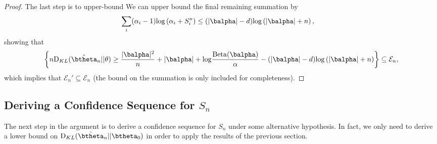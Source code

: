 \documentclass[11pt]{article}
\def\log{{\rm log}}
\newcommand{\Beta}{\mathrm{Beta}}
\newcommand{\KL}{\mathrm{D}_{KL}}
\begin{document}
\begin{proof}
The last step is to upper-bound
We can upper bound the final remaining summation by
\begin{align*}
  \sum_i(\alpha_i-1)\log
  \left(
  \alpha_i + S_i^n
  \right)
  &\leq
    (|\balpha|-d)\log
    \left(
    |\balpha|+n
    \right),
\end{align*}
showing that
\[
      \left\{
    n \KL(\hat\btheta_n|| \theta)
    \geq
      \frac{|\balpha|^2}{n} + |\balpha|
      +\log\frac{\Beta(\balpha)}{\alpha}
      -
          (|\balpha|-d)\log
    \left(
    |\balpha|+n
    \right)
  \right\}
  \subseteq \mathcal E_n,
\]
which implies that $\mathcal E_n' \subseteq \mathcal E_n$ (the bound on the summation is only included for completeness).
\end{proof}

\subsection{Deriving a Confidence Sequence for $S_n$}
The next step in the argument is to derive a confidence sequence for $S_n$ under some alternative hypothesis. In fact, we only need to derive a lower bound on $\KL (\hat\btheta_n||\btheta_0)$ in order to apply the results of the previous section.
\end{document}

